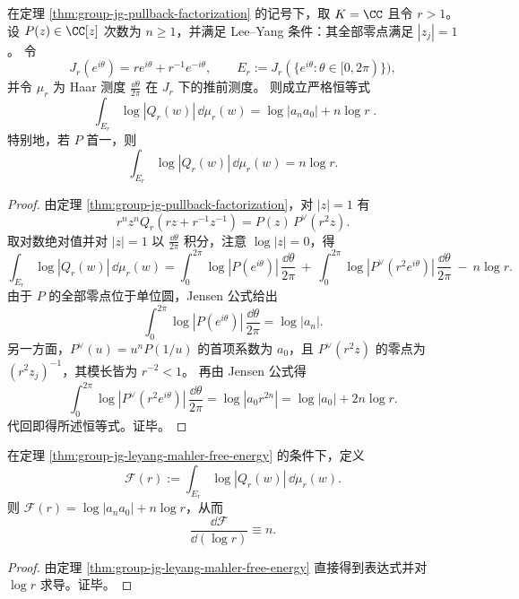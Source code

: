 \begin{theorem}\label{thm:group-jg-leyang-mahler-free-energy}
在定理 \ref{thm:group-jg-pullback-factorization} 的记号下，取 \(K=\CC\) 且令 \(r>1\)。
设 \(P(z)\in\CC[z]\) 次数为 \(n\ge 1\)，并满足 Lee--Yang 条件：其全部零点满足 \(|z_j|=1\)。
令
\[
J_r(e^{i\theta})=r e^{i\theta}+r^{-1}e^{-i\theta},
\qquad
E_r:=J_r(\{e^{i\theta}:\theta\in[0,2\pi)\}),
\]
并令 \(\mu_r\) 为 Haar 测度 \(\frac{\dd\theta}{2\pi}\) 在 \(J_r\) 下的推前测度。
则成立严格恒等式
\[
\boxed{\;
\int_{E_r}\log|Q_r(w)|\,\dd\mu_r(w)=\log|a_n a_0|+n\log r\; }.
\]
特别地，若 \(P\) 首一，则
\[
\int_{E_r}\log|Q_r(w)|\,\dd\mu_r(w)=n\log r.
\]
\end{theorem}

\begin{proof}
由定理 \ref{thm:group-jg-pullback-factorization}，对 \(|z|=1\) 有
\[
r^n z^n Q_r\!\left(r z+r^{-1}z^{-1}\right)=P(z)\,P^{\vee}(r^2 z).
\]
取对数绝对值并对 \(|z|=1\) 以 \(\frac{\dd\theta}{2\pi}\) 积分，注意 \(\log|z|=0\)，得
\[
\int_{E_r}\log|Q_r(w)|\,\dd\mu_r(w)
=\int_{0}^{2\pi}\log|P(e^{i\theta})|\,\frac{\dd\theta}{2\pi}
\ +\ \int_{0}^{2\pi}\log|P^{\vee}(r^2 e^{i\theta})|\,\frac{\dd\theta}{2\pi}
\ -\ n\log r.
\]
由于 \(P\) 的全部零点位于单位圆，Jensen 公式给出
\[
\int_{0}^{2\pi}\log|P(e^{i\theta})|\,\frac{\dd\theta}{2\pi}=\log|a_n|.
\]
另一方面，\(P^\vee(u)=u^n P(1/u)\) 的首项系数为 \(a_0\)，且 \(P^\vee(r^2 z)\) 的零点为 \((r^2 z_j)^{-1}\)，其模长皆为 \(r^{-2}<1\)。
再由 Jensen 公式得
\[
\int_{0}^{2\pi}\log|P^{\vee}(r^2 e^{i\theta})|\,\frac{\dd\theta}{2\pi}
=\log|a_0 r^{2n}|=\log|a_0|+2n\log r.
\]
代回即得所述恒等式。证毕。
\end{proof}


\begin{corollary}[椭圆输运自由能的线性响应]\label{cor:group-jg-leyang-free-energy-linear-flux}
在定理 \ref{thm:group-jg-leyang-mahler-free-energy} 的条件下，定义
\[
\mathcal F(r):=\int_{E_r}\log|Q_r(w)|\,\dd\mu_r(w).
\]
则 \(\mathcal F(r)=\log|a_n a_0|+n\log r\)，从而
\[
\frac{\dd \mathcal F}{\dd(\log r)}\equiv n.
\]
\end{corollary}

\begin{proof}
由定理 \ref{thm:group-jg-leyang-mahler-free-energy} 直接得到表达式并对 \(\log r\) 求导。证毕。
\end{proof}

